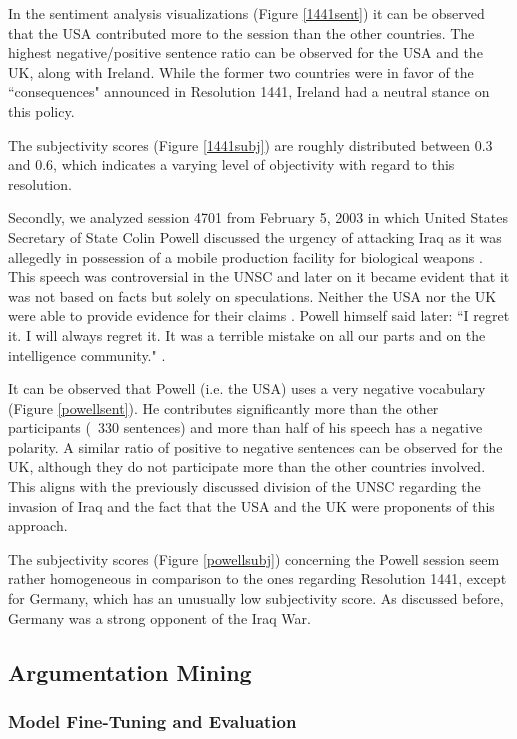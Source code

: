 In the sentiment analysis visualizations (Figure \ref{1441sent}) it can be observed that the USA contributed more to the session than the other countries. The highest negative/positive sentence ratio can be observed for the USA and the UK, along with Ireland. While the former two countries were in favor of the ``consequences" announced in Resolution 1441, Ireland had a neutral stance on this policy.

The subjectivity scores (Figure \ref{1441subj}) are roughly distributed between 0.3 and 0.6, which indicates a varying level of objectivity with regard to this resolution.

Secondly, we analyzed session 4701 from February 5, 2003 in which United States Secretary of State Colin Powell discussed the urgency of attacking Iraq as it was allegedly in possession of a mobile production facility for biological weapons \citep{cia}. This speech was controversial in the UNSC and later on it became evident that it was not based on facts but solely on speculations. Neither the USA nor the UK were able to provide evidence for their claims \citep{iraqev}. 
Powell himself said later: ``I regret it. I will always regret it. It was a terrible mistake on all our parts and on the intelligence community." \citep{powell}.

It can be observed that Powell (i.e. the USA) uses a very negative vocabulary (Figure \ref{powellsent}). He contributes significantly more than the other participants (~330 sentences) and more than half of his speech has a negative polarity. A similar ratio of positive to negative sentences can be observed for the UK, although they do not participate more than the other countries involved. This aligns with the previously discussed division of the UNSC regarding the invasion of Iraq and the fact that the USA and the UK were proponents of this approach.

The subjectivity scores (Figure \ref{powellsubj}) concerning the Powell session seem rather homogeneous in comparison to the ones regarding Resolution 1441, except for Germany, which has an unusually low subjectivity score. As discussed before, Germany was a strong opponent of the Iraq War.

\subsection{Argumentation Mining}
\subsubsection{Model Fine-Tuning and Evaluation}

